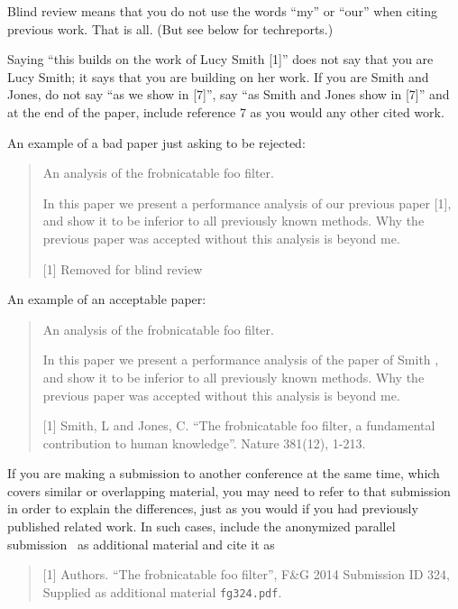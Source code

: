 \documentclass[10pt,twocolumn,letterpaper]{article}
\begin{document}
Blind review means that you do not use the words ``my'' or ``our''
when citing previous work.  That is all.  (But see below for
techreports.)

Saying ``this builds on the work of Lucy Smith [1]'' does not say
that you are Lucy Smith; it says that you are building on her
work.  If you are Smith and Jones, do not say ``as we show in
[7]'', say ``as Smith and Jones show in [7]'' and at the end of the
paper, include reference 7 as you would any other cited work.

An example of a bad paper just asking to be rejected:
\begin{quote}
\begin{center}
    An analysis of the frobnicatable foo filter.
\end{center}

   In this paper we present a performance analysis of our
   previous paper [1], and show it to be inferior to all
   previously known methods.  Why the previous paper was
   accepted without this analysis is beyond me.

   [1] Removed for blind review
\end{quote}


An example of an acceptable paper:

\begin{quote}
\begin{center}
     An analysis of the frobnicatable foo filter.
\end{center}

   In this paper we present a performance analysis of the
   paper of Smith \etal [1], and show it to be inferior to
   all previously known methods.  Why the previous paper
   was accepted without this analysis is beyond me.

   [1] Smith, L and Jones, C. ``The frobnicatable foo
   filter, a fundamental contribution to human knowledge''.
   Nature 381(12), 1-213.
\end{quote}

If you are making a submission to another conference at the same time,
which covers similar or overlapping material, you may need to refer to that
submission in order to explain the differences, just as you would if you
had previously published related work.  In such cases, include the
anonymized parallel submission~ as additional material and
cite it as
\begin{quote}
[1] Authors. ``The frobnicatable foo filter'', F\&G 2014 Submission ID 324,
Supplied as additional material {\tt fg324.pdf}.
\end{quote}
\end{document}
